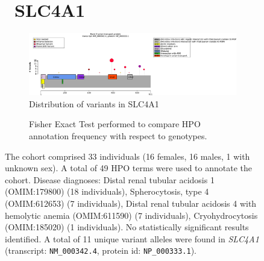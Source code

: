 \begin{figure}[htbp]
\section*{ SLC4A1}
\centering
\begin{subfigure}[b]{0.95\textwidth}
\centering
\includegraphics[width=\textwidth]{ img/SLC4A1_protein_diagram.pdf} 
\captionsetup{justification=raggedright,singlelinecheck=false}
\caption{Distribution of variants in SLC4A1}
\end{subfigure}

\vspace{2em}

\begin{subfigure}[b]{0.95\textwidth}
\centering
{}
\captionsetup{justification=raggedright,singlelinecheck=false}
\caption{Fisher Exact Test performed to compare HPO annotation frequency with respect to genotypes.}
\end{subfigure}

\vspace{2em}

\caption{The cohort comprised 33 individuals (16 females, 16 males, 1 with unknown sex). A total of 49 HPO terms were used to annotate the cohort. Disease diagnoses: Distal renal tubular acidosis 1 (OMIM:179800) (18 individuals), Spherocytosis, type 4 (OMIM:612653) (7 individuals), Distal renal tubular acidosis 4 with hemolytic anemia (OMIM:611590) (7 individuals), Cryohydrocytosis (OMIM:185020) (1 individuals). No statistically significant results identified. A total of 11 unique variant alleles were found in \textit{SLC4A1} (transcript: \texttt{NM\_000342.4}, protein id: \texttt{NP\_000333.1}).}
\end{figure}
